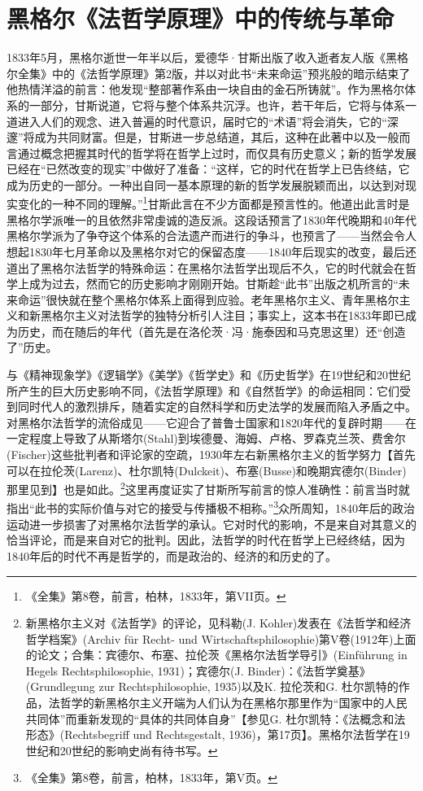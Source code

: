 \chapter{黑格尔《法哲学原理》中的传统与革命}

1833年5月，黑格尔逝世一年半以后，爱德华·甘斯出版了收入逝者友人版《黑格尔全集》中的《法哲学原理》第2版，并以对此书“未来命运”预兆般的暗示结束了他热情洋溢的前言：他发现“整部著作系由一块自由的金石所铸就”。作为黑格尔体系的一部分，甘斯说道，它将与整个体系共沉浮。也许，若干年后，它将与体系一道进入人们的观念、进入普遍的时代意识，届时它的“术语”将会消失，它的“深邃”将成为共同财富。但是，甘斯进一步总结道，其后，这种在此著中以及一般而言通过概念把握其时代的哲学将在哲学上过时，而仅具有历史意义；新的哲学发展已经在“已然改变的现实”中做好了准备：“这样，它的时代在哲学上已告终结，它成为历史的一部分。一种出自同一基本原理的新的哲学发展脱颖而出，以达到对现实变化的一种不同的理解。”\footnote{《全集》第8卷，前言，柏林，1833年，第VII页。}甘斯此言在不少方面都是预言性的。他道出此言时是黑格尔学派唯一的且依然非常虔诚的造反派。这段话预言了1830年代晚期和40年代黑格尔学派为了争夺这个体系的合法遗产而进行的争斗，也预言了——当然会令人想起1830年七月革命以及黑格尔对它的保留态度——1840年后现实的改变，最后还道出了黑格尔法哲学的特殊命运：在黑格尔法哲学出现后不久，它的时代就会在哲学上成为过去，然而它的历史影响才刚刚开始。甘斯趁“此书”出版之机所言的“未来命运”很快就在整个黑格尔体系上面得到应验。老年黑格尔主义、青年黑格尔主义和新黑格尔主义对法哲学的独特分析引人注目；事实上，这本书在1833年即已成为历史，而在随后的年代（首先是在洛伦茨·冯·施泰因和马克思这里）还“创造了”历史。

与《精神现象学》《逻辑学》《美学》《哲学史》和《历史哲学》在19世纪和20世纪所产生的巨大历史影响不同，《法哲学原理》和《自然哲学》的命运相同：它们受到同时代人的激烈排斥，随着实定的自然科学和历史法学的发展而陷入矛盾之中。对黑格尔法哲学的流俗成见——它迎合了普鲁士国家和1820年代的复辟时期——在一定程度上导致了从斯塔尔(Stahl)到埃德曼、海姆、卢格、罗森克兰茨、费舍尔(Fischer)这些批判者和评论家的空疏，1930年左右新黑格尔主义的哲学努力【首先可以在拉伦茨(Larenz)、杜尔凯特(Dulckeit)、布塞(Busse)和晚期宾德尔(Binder)那里见到】也是如此。\footnote{新黑格尔主义对《法哲学》的评论，见科勒(J. Kohler)发表在《法哲学和经济哲学档案》(Archiv für Recht- und Wirtschaftsphilosophie)第V卷(1912年)上面的论文；合集：宾德尔、布塞、拉伦茨《黑格尔法哲学导引》(Einführung in Hegels Rechtsphilosophie, 1931)；宾德尔(J. Binder)：《法哲学奠基》(Grundlegung zur Rechtsphilosophie, 1935)以及K. 拉伦茨和G. 杜尔凯特的作品，法哲学的新黑格尔主义开端为人们认为在黑格尔那里作为“国家中的人民共同体”而重新发现的“具体的共同体自身”【参见G. 杜尔凯特：《法概念和法形态》(Rechtsbegriff und Rechtsgestalt, 1936)，第17页】。黑格尔法哲学在19世纪和20世纪的影响史尚有待书写。}这里再度证实了甘斯所写前言的惊人准确性：前言当时就指出“此书的实际价值与对它的接受与传播极不相称。”\footnote{《全集》第8卷，前言，柏林，1833年，第V页。}众所周知，1840年后的政治运动进一步损害了对黑格尔法哲学的承认。它对时代的影响，不是来自对其意义的恰当评论，而是来自对它的批判。因此，法哲学的时代在哲学上已经终结，因为1840年后的时代不再是哲学的，而是政治的、经济的和历史的了。

